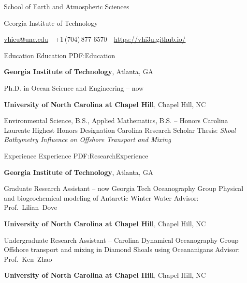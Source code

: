 \documentclass[letterpaper,MMMyyyy,nonstopmode]{simpleresumecv}
\newcommand{\CVAuthor}{Victor Hieu Nguyen}
\newcommand{\CVWebpage}{https://vhi3u.github.io/}
\begin{document}

\Title{\CVAuthor}

\begin{SubTitle}
School of Earth and Atmospheric Sciences 
\par
Georgia Institute of Technology
\par
\href{mailto:vhieu@unc.edu}
{vhieu@unc.edu}
\,\SubBulletSymbol\,
+1\,(704)\,877-6570
\,\SubBulletSymbol\,
\href{\CVWebpage}
{\url{\CVWebpage}}
\end{SubTitle}

\begin{Body}


\Section
{Education}
{Education}
{PDF:Education}

\Entry
\textbf{Georgia Institute of Technology},
Atlanta, GA

\Gap
Ph.D. in
Ocean Science and Engineering
\hfill
{} -- now

\BigGap
\Entry
\textbf{University of North Carolina at Chapel Hill},
Chapel Hill, NC

\Gap
Environmental Science, B.S., Applied Mathematics, B.S.
\hfill
{} --
\BulletItem
Honors Carolina Laureate
\BulletItem
Highest Honors Designation
\BulletItem
Carolina Research Scholar
\BulletItem
Thesis: \textit{Shoal Bathymetry Influence on Offshore Transport and Mixing}



\Section
{Experience}
{Experience}
{PDF:ResearchExperience}

\Entry
{\textbf{Georgia Institute of Technology}},
Atlanta, GA

\Gap
Graduate Research Assistant\hfill
{} -- now
\BulletItem
Georgia Tech Oceanography Group
\BulletItem
Physical and biogeochemical modeling of Antarctic Winter Water 
\BulletItem
Advisor:
Prof.~Lilian~Dove

\Gap
\Entry
{\textbf{University of North Carolina at Chapel Hill}},
Chapel Hill, NC

\Gap
Undergraduate Research Assistant\hfill
{} -- 
\BulletItem
Carolina Dynamical Oceanography Group
\BulletItem
Offshore transport and mixing in Diamond Shoals using Oceananigans
\BulletItem
Advisor:
Prof.~Ken~Zhao

\Gap
\Entry
{\textbf{University of North Carolina at Chapel Hill}}, Chapel Hill, NC


\end{Body}
\end{document}
